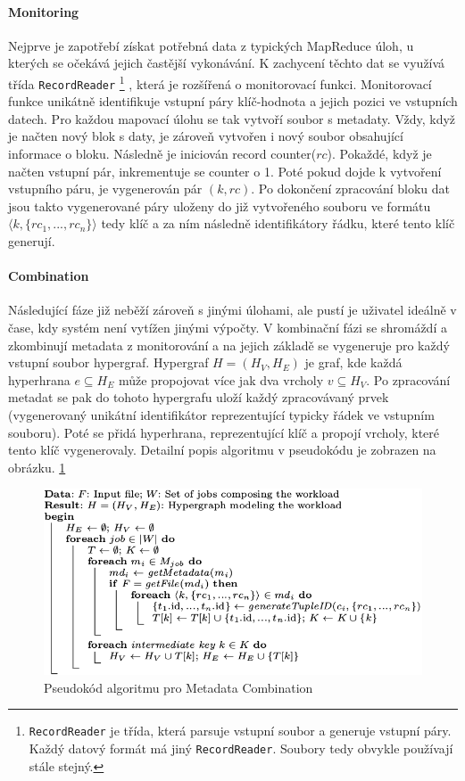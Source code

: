 \documentclass[thesis=M,czech]{FITthesis}[2012/06/26]
\begin{document}
\paragraph{Monitoring}
Nejprve je zapotřebí získat potřebná data z typických MapReduce úloh, u kterých se očekává jejich častější vykonávání. K zachycení těchto dat se využívá třída  \texttt{RecordReader} \footnote{\texttt{RecordReader} je třída, která parsuje vstupní soubor a generuje vstupní páry. Každý datový formát má jiný \texttt{RecordReader}. Soubory tedy obvykle používají stále stejný.} , která je rozšířená o  monitorovací funkci. Monitorovací funkce unikátně identifikuje vstupní páry klíč-hodnota a jejich pozici ve vstupních datech. Pro každou mapovací úlohu se tak vytvoří soubor s metadaty. Vždy, když je načten nový blok s daty, je zároveň vytvořen i nový soubor obsahující informace o bloku. Následně je iniciován record counter($rc$). Pokaždé, když je načten vstupní pár, inkrementuje se counter o 1. Poté pokud dojde k vytvoření vstupního páru, je vygenerován pár $(k, rc)$. Po dokončení zpracování bloku dat jsou takto vygenerované páry uloženy do již vytvořeného souboru ve formátu $\langle k,\{rc_1, ..., rc_n\}\rangle$ tedy klíč a za ním následně identifikátory řádku, které tento klíč generují.
\paragraph{Combination}
Následující fáze již neběží zároveň s jinými úlohami, ale pustí je uživatel ideálně v čase, kdy systém není vytížen jinými výpočty. V kombinační fázi se shromáždí a zkombinují metadata z monitorování a na jejich základě se vygeneruje pro každý vstupní soubor hypergraf. Hypergraf $H = (H_V, H_E)$ je graf, kde každá hyperhrana $e \subseteq H_E$ může propojovat více jak dva vrcholy  $v \subseteq H_V$. Po zpracování metadat se pak do tohoto hypergrafu uloží každý zpracovávaný prvek (vygenerovaný unikátní identifikátor reprezentující typicky řádek ve vstupním souboru).  Poté se přidá hyperhrana, reprezentující klíč a propojí vrcholy, které tento klíč vygenerovaly. Detailní popis algoritmu v pseudokódu je zobrazen na obrázku. \ref{fig:alg1}

\begin{figure}\centering
	\includegraphics[width=1\textwidth, angle=0]{files/alg1}
	\caption[Pseudokód algoritmu pro Metadata Combination]
	{Pseudokód algoritmu pro Metadata Combination}\label{fig:alg1}
\end{figure} 
\end{document}

